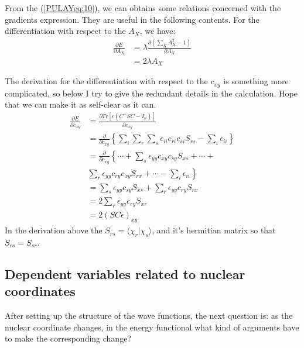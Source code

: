 From the (\ref{PULAYeq:10}), we can obtains some relations concerned
with the gradients expression. They are useful in the following
contents. For the differentiation with respect to the $A_{X}$, we
have:
\begin{equation}\label{PULAYeq:11}
  \begin{split}
    \frac{\partial E}{\partial A_{X}} &=
    \lambda\frac{\partial (\sum_{K}A_{K}^{2} - 1)}{\partial A_{X}} \\
    &=2\lambda A_{X}
  \end{split}
\end{equation}

The derivation for the differentiation with respect to the $c_{xy}$ is
something more complicated, so below I try to give the redundant
details in the calculation. Hope that we can make it as self-clear as
it can.
\begin{align}\label{PULAYeq:12}
  \frac{\partial E}{\partial c_{xy}} &= \frac{\partial
    Tr[\epsilon(C^{+}SC - I_{n})]}{\partial c_{xy}} \nonumber \\
  &=\frac{\partial}{\partial c_{xy}}\left\{ \sum_{i}\sum_{r}\sum_{s}
    \epsilon_{ii}c_{ri}c_{si}S_{rs} -
    \sum_{i}\epsilon_{ii} \right\}\nonumber \\
  &=\frac{\partial}{\partial c_{xy}} \left\{\cdots + \sum_{s}
    \epsilon_{yy}c_{xy}c_{sy}S_{xs} + \cdots + \right.\nonumber \\
  &\left.\sum_{r} \epsilon_{yy}c_{ry}c_{xy}S_{rx} + \cdots -
    \sum_{i}\epsilon_{ii}\right\} \nonumber \\
  &=\sum_{s} \epsilon_{yy}c_{sy}S_{xs} + \sum_{r}
  \epsilon_{yy}c_{ry}S_{rx} \nonumber \\
  &=2\sum_{r} \epsilon_{yy}c_{ry}S_{xr} \nonumber \\
  &=2(SC\epsilon)_{xy}
\end{align}
In the derivation above the $S_{rs} =
\langle\chi_{r}|\chi_{s}\rangle$, and it's hermitian matrix so that
$S_{rs} = S_{sr}$.


\subsection{Dependent variables related to nuclear coordinates}
%
%
After setting up the structure of the wave functions, the next
question is: as the nuclear coordinate changes, in the energy
functional what kind of arguments have to make the corresponding
change?

